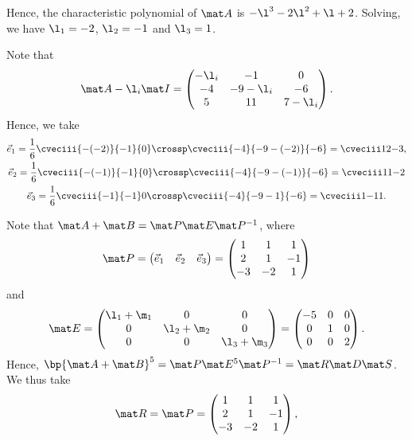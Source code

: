 \begin{solution}
\begin{ppart}
\begin{psubpart}
            Hence, the characteristic polynomial of $\mat A$ is $-\l^3 - 2 \l^2 + \l + 2$. Solving, we have $\l_1 = -2$, $\l_2 = -1$ and $\l_3 = 1$.

            Note that \[\mat A - \l_i \mat I = \begin{pmatrix}-\l_i & -1 & 0 \\ -4 & -9 - \l_i & -6 \\ 5 & 11 & 7 - \l_i\end{pmatrix}.\] Hence, we take
            \begin{gather*}
                \vec e_1 = \frac16 \cveciii{- (-2)}{-1}{0} \crossp \cveciii{-4}{-9 - (-2)}{-6} = \cveciii12{-3},\\
                \vec e_2 = \frac16 \cveciii{- (-1)}{-1}{0} \crossp \cveciii{-4}{-9 - (-1)}{-6} = \cveciii11{-2}\\
                \vec e_3 = \frac16 \cveciii{-1}{-1}0 \crossp \cveciii{-4}{-9 - 1}{-6} = \cveciii1{-1}1.
            \end{gather*}
        \end{psubpart}
        \begin{psubpart}
            Note that $\mat A + \mat B = \mat P \mat E \mat P^{-1}$, where \[\mat P = \begin{pmatrix}\vec e_1 & \vec e_2 & \vec e_3 \end{pmatrix} = \begin{pmatrix}1 & 1 & 1 \\ 2 & 1 & -1 \\ -3 & -2 & 1\end{pmatrix}\] and \[\mat E = \begin{pmatrix}\l_1 + \m_1 & 0 & 0 \\ 0 & \l_2 + \m_2 & 0 \\ 0 & 0 & \l_3 + \m_3\end{pmatrix} = \begin{pmatrix}-5 & 0 & 0 \\ 0 & 1 & 0 \\ 0 & 0 & 2\end{pmatrix}.\] Hence, $\bp{\mat A + \mat B}^5 = \mat P \mat E^5 \mat P^{-1} = \mat R \mat D \mat S$. We thus take
            \begin{gather*}
                \mat R = \mat P = \begin{pmatrix}1 & 1 & 1 \\ 2 & 1 & -1 \\ -3 & -2 & 1\end{pmatrix},\\

\end{gather*}
\end{psubpart}
\end{ppart}
\end{solution}
